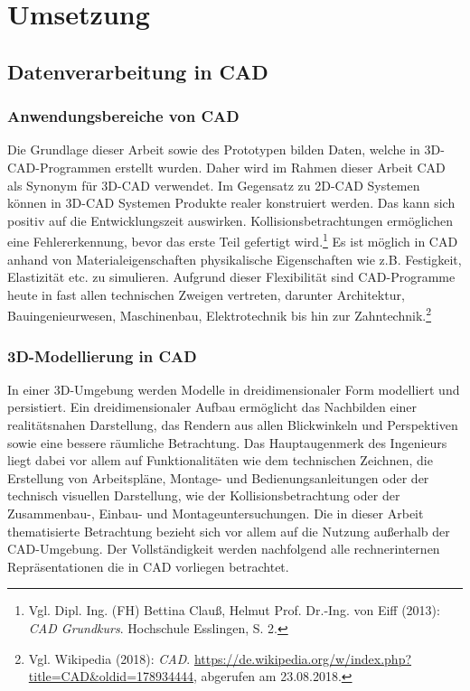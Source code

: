 \chapter{Umsetzung}
\section{Datenverarbeitung in CAD}
\label{sec:DatenverarbeitungInCAD}
\subsection{Anwendungsbereiche von CAD}
\label{subsec:AnwendungsbereicheVonCAD}
Die Grundlage dieser Arbeit sowie des Prototypen bilden Daten, welche in 3D-CAD-Programmen erstellt wurden. Daher wird im Rahmen dieser Arbeit CAD als Synonym für 3D-CAD verwendet. Im Gegensatz zu 2D-CAD Systemen können in 3D-CAD Systemen Produkte realer konstruiert werden. Das kann sich positiv auf die Entwicklungszeit auswirken. Kollisionsbetrachtungen ermöglichen eine Fehlererkennung, bevor das erste Teil gefertigt wird.\footnote{Vgl. Dipl. Ing. (FH) Bettina Clauß, Helmut Prof. Dr.-Ing. von Eiff (2013): \textit{CAD Grundkurs}. Hochschule Esslingen, S. 2.} Es ist möglich in CAD anhand von Materialeigenschaften physikalische Eigenschaften wie z.B. Festigkeit, Elastizität etc. zu simulieren. Aufgrund dieser Flexibilität sind CAD-Programme heute in fast allen technischen Zweigen vertreten, darunter Architektur, Bauingenieurwesen, Maschinenbau, Elektrotechnik bis hin zur Zahntechnik.\footnote{Vgl. Wikipedia  (2018): \textit{CAD}.\newline
\url{https://de.wikipedia.org/w/index.php?title=CAD&oldid=178934444},\newline 
abgerufen am 23.08.2018.}


\subsection{3D-Modellierung in CAD}
\label{subsec:3D-ModellierungInCAD}
In einer 3D-Umgebung werden Modelle in dreidimensionaler Form modelliert und persistiert. Ein dreidimensionaler Aufbau ermöglicht das Nachbilden einer realitätsnahen Darstellung, das Rendern aus allen Blickwinkeln und Perspektiven sowie eine bessere räumliche Betrachtung. Das Hauptaugenmerk des Ingenieurs liegt dabei vor allem auf Funktionalitäten wie dem technischen Zeichnen, die Erstellung von Arbeitspläne, Montage- und Bedienungsanleitungen oder der technisch visuellen Darstellung, wie der Kollisionsbetrachtung oder der
Zusammenbau-, Einbau- und Montageuntersuchungen. 
Die in dieser Arbeit thematisierte Betrachtung bezieht sich vor allem auf die Nutzung außerhalb der CAD-Umgebung.  Der Vollständigkeit werden nachfolgend alle rechnerinternen Repräsentationen die in CAD vorliegen betrachtet.

